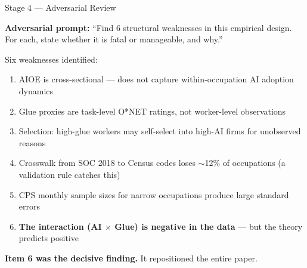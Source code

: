 \documentclass[10pt,english,aspectratio=169]{beamer}
\begin{document}
\begin{frame}{Stage 4 --- Adversarial Review}
\begin{tcolorbox}[colback=blue!3, colframe=RedTitle!60]
\textbf{Adversarial prompt:} ``Find 6 structural weaknesses in this empirical design. For each, state whether it is fatal or manageable, and why.''
\end{tcolorbox}
\vspace{0.2cm}
Six weaknesses identified:
\begin{enumerate}\small
  \item AIOE is cross-sectional --- does not capture within-occupation AI adoption dynamics
  \item Glue proxies are task-level O*NET ratings, not worker-level observations
  \item Selection: high-glue workers may self-select into high-AI firms for unobserved reasons
  \item Crosswalk from SOC 2018 to Census codes loses $\sim$12\% of occupations (a validation rule catches this)
  \item CPS monthly sample sizes for narrow occupations produce large standard errors
  \item \textbf{The interaction (AI $\times$ Glue) is negative in the data} --- but the theory predicts positive
\end{enumerate}
\vspace{0.2cm}
\textbf{Item 6 was the decisive finding.} It repositioned the entire paper.
\end{frame}
\end{document}

